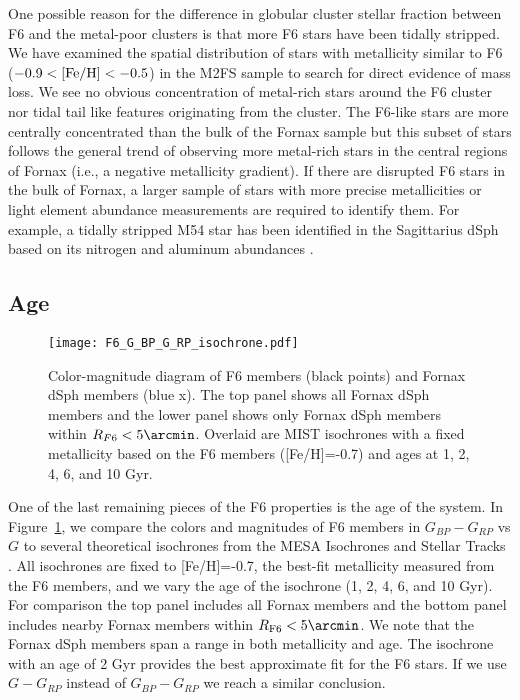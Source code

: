 \documentclass[twocolumn]{aastex63}
\begin{document}
One possible reason for the difference in globular cluster stellar fraction between F6 and the metal-poor clusters is that more F6 stars have been tidally stripped.  We have examined the spatial distribution of stars with metallicity similar to F6 ($-0.9 < {\rm [Fe/H]}<-0.5$) in the M2FS sample to search for direct evidence of mass loss.  We see no obvious concentration of metal-rich stars around the F6 cluster nor tidal tail like features originating from the cluster.  
The F6-like stars are more centrally concentrated than the bulk of the Fornax sample but this subset of stars follows the general trend of observing more metal-rich stars in the central regions of Fornax (i.e., a negative metallicity gradient).
If there are disrupted F6 stars in the bulk of Fornax, a larger sample of stars with more precise metallicities  or light element abundance measurements are required to identify them.  For example, a tidally stripped M54 star has been identified in the Sagittarius dSph based on its nitrogen and aluminum abundances  \citep{FernandezTrincado2021A&A...648A..70F}.

\subsection{Age}

\begin{figure}
\texttt{[image: F6\_G\_BP\_G\_RP\_isochrone.pdf]}
\caption{Color-magnitude diagram of F6 members (black points) and  Fornax dSph members (blue x).  The top panel shows all Fornax dSph members and the lower panel shows only Fornax dSph members within $R_{F6}<5\arcmin$. Overlaid are MIST isochrones with a fixed metallicity based on the F6 members ([Fe/H]=-0.7) and ages at 1, 2, 4, 6, and 10 Gyr. 
}
\label{fig:cmd_isochrone}
\end{figure}

One of the last remaining pieces of the F6 properties is the age of the system.
In Figure~\ref{fig:cmd_isochrone}, we compare the colors and magnitudes of F6 members in $G_{BP}-G_{RP}$ vs $G$  to several theoretical isochrones from the MESA Isochrones and Stellar Tracks  \citep[MIST;][]{Dotter2016ApJS..222....8D, Choi2016ApJ...823..102C}. 
All isochrones are fixed to [Fe/H]=-0.7, the best-fit metallicity measured from the F6 members, and we vary the age of the isochrone (1, 2, 4, 6, and 10 Gyr). For comparison the top panel includes all Fornax members and the bottom panel includes nearby Fornax members within $R_{\rm F6}<5\arcmin$. We note that the Fornax dSph members span a range in both metallicity and age.
The isochrone with an age of 2 Gyr provides the best approximate fit for the F6 stars. If we use $G-G_{RP}$ instead of $G_{BP}-G_{RP}$ we reach a similar conclusion. 
\end{document}
